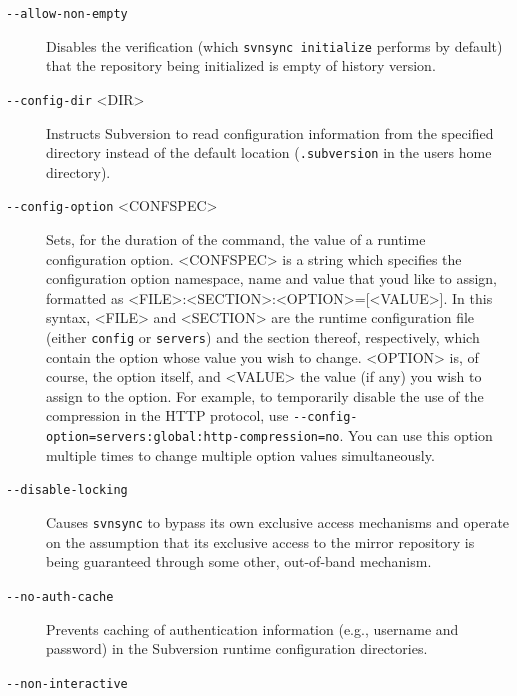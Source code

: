 \begin{description}
\item[\protect{}\label{svn.ref.svnsync.sw.allow_non_empty}{}\texttt{-\/-allow-non-empty}]
Disables the verification (which \texttt{svnsync\ initialize} performs
by default) that the repository being initialized is empty of history
version.
\item[\protect{}\label{svn.ref.svnsync.sw.config_dir}{}\texttt{-\/-config-dir}
\textless DIR\textgreater{}]
Instructs Subversion to read configuration information from the
specified directory instead of the default location
(\texttt{.subversion} in the user\textquotesingle s home directory).
\item[\protect{}\label{svn.ref.svnsync.sw.config_option}{}\texttt{-\/-config-option}
\textless CONFSPEC\textgreater{}]
Sets, for the duration of the command, the value of a runtime
configuration option. \textless CONFSPEC\textgreater{} is a string which
specifies the configuration option namespace, name and value that
you\textquotesingle d like to assign, formatted as
\textless FILE\textgreater:\textless SECTION\textgreater:\textless OPTION\textgreater={[}\textless VALUE\textgreater{]}.
In this syntax, \textless FILE\textgreater{} and
\textless SECTION\textgreater{} are the runtime configuration file
(either \texttt{config} or \texttt{servers}) and the section thereof,
respectively, which contain the option whose value you wish to change.
\textless OPTION\textgreater{} is, of course, the option itself, and
\textless VALUE\textgreater{} the value (if any) you wish to assign to
the option. For example, to temporarily disable the use of the
compression in the HTTP protocol, use
\texttt{-\/-config-option=servers:global:http-compression=no}. You can
use this option multiple times to change multiple option values
simultaneously.
\item[\protect{}\label{svn.ref.svnsync.sw.disable_locking}{}\texttt{-\/-disable-locking}]
Causes \texttt{svnsync} to bypass its own exclusive access mechanisms
and operate on the assumption that its exclusive access to the mirror
repository is being guaranteed through some other, out-of-band
mechanism.
\item[\protect{}\label{svn.ref.svnsync.sw.no_auth_cache}{}\texttt{-\/-no-auth-cache}]
Prevents caching of authentication information (e.g., username and
password) in the Subversion runtime configuration directories.
\item[\protect{}\label{svn.ref.svnsync.sw.non_interactive}{}\texttt{-\/-non-interactive}]

\end{description}
